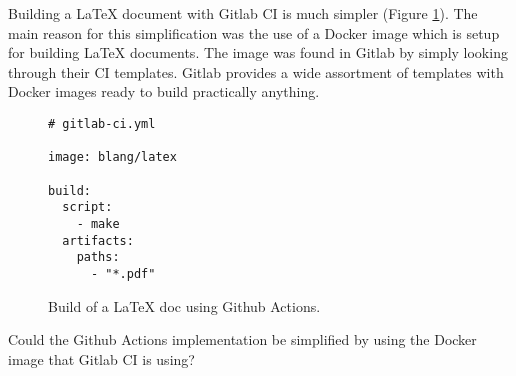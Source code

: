 \documentclass{article}
\begin{document}
Building a LaTeX document with Gitlab CI is much simpler
(Figure
\ref{fig:gitlab-ci-build})\autocite{gitlab-jmmahler-resume-gitlab-ci.yml}\autocite{gitlab-resume-build-533777462}.
The main reason for this simplification was the use of a
Docker image which is setup for building LaTeX documents.
The image was found in Gitlab by simply looking through their CI
templates.
Gitlab provides a wide assortment of templates with Docker images
ready to build practically anything.

\begin{figure}[!ht]
\begin{lstlisting}
# gitlab-ci.yml

image: blang/latex

build:
  script:
    - make
  artifacts:
    paths:
      - "*.pdf"
\end{lstlisting}
\label{fig:gitlab-ci-build}
\caption{Build of a LaTeX doc using Github Actions.}
\end{figure}

Could the Github Actions implementation be simplified by using the
Docker image that Gitlab CI is using?

\clearpage
\printbibliography[heading=bibintoc]
\end{document}

